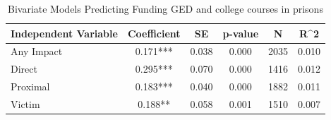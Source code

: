 \begin{table}

\caption{\label{tab:tab:q25_4_rev_bivariate}Bivariate Models Predicting Funding GED and college courses in prisons}
\centering
\begin{tabular}[t]{lccccc}
\toprule
Independent Variable & Coefficient & SE & p-value & N & R\textasciicircum{}2\\
\midrule
Any Impact & 0.171*** & 0.038 & 0.000 & 2035 & 0.010\\
Direct & 0.295*** & 0.070 & 0.000 & 1416 & 0.012\\
Proximal & 0.183*** & 0.040 & 0.000 & 1882 & 0.011\\
Victim & 0.188** & 0.058 & 0.001 & 1510 & 0.007\\
\bottomrule
\end{tabular}
\end{table}
